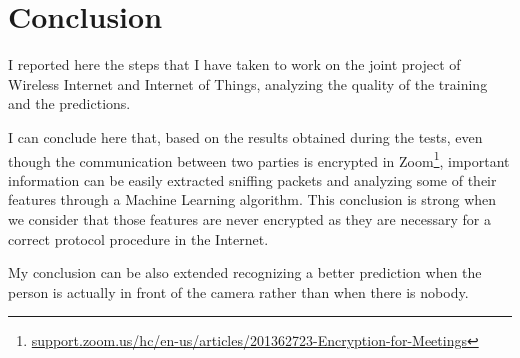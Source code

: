 \section{Conclusion}

I reported here the steps that I have taken to work on the joint project of Wireless Internet and Internet of Things, analyzing the quality of the training and the predictions.

I can conclude here that, based on the results obtained during the tests, even though the communication between two parties is encrypted in Zoom\footnote{\href{https://support.zoom.us/hc/en-us/articles/201362723-Encryption-for-Meetings}{support.zoom.us/hc/en-us/articles/201362723-Encryption-for-Meetings}}, important information can be easily extracted sniffing packets and analyzing some of their features through a Machine Learning algorithm. This conclusion is strong when we consider that those features are never encrypted as they are necessary for a correct protocol procedure in the Internet.

My conclusion can be also extended recognizing a better prediction when the person is actually in front of the camera rather than when there is nobody.